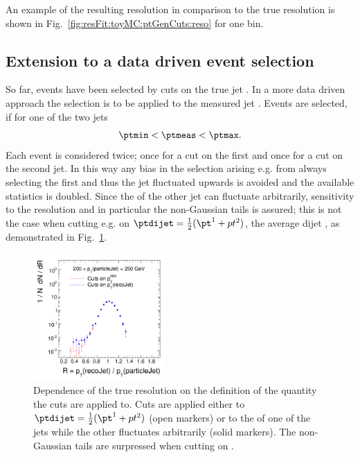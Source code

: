 \documentclass[a4paper]{cmspaper} %
\begin{document}
An example of the resulting resolution in comparison to the true
resolution is shown in Fig.~\ref{fig:resFit:toyMC:ptGenCuts:reso} for
one \pttrue bin.


\subsection{Extension to a data driven event selection}\label{sec:resFit:dataDrivenExt}
So far, events have been selected by cuts on the true jet \pt.
In a more data driven approach the selection is to be applied to the measured jet \pt.
Events are selected, if for one of the two jets
\begin{equation*}
  \ptmin < \ptmeas < \ptmax.
\end{equation*}
Each event is considered twice; once for a \pt cut on the first and once for a \pt cut on the second jet.
In this way any bias in the selection arising e.g. from always selecting the first and thus the jet fluctuated upwards is avoided and the available statistics is doubled.
Since the \pt of the other jet can fluctuate arbitrarily, sensitivity to the resolution and in particular the non-Gaussian tails is assured; this is not the case when cutting e.g. on \mbox{$\ptdijet = \frac{1}{2}(\pt^{1}+pt^{2})$}, the average dijet \pt, as demonstrated in Fig.~\ref{fig:resFit:ptBinning}.

\begin{figure}[ht]
  \centering
  \includegraphics[width=0.45\textwidth]{figures/resFit_QCD_PtBinningComp}
  \caption{Dependence of the true resolution on the definition of the quantity the cuts are applied to.
    Cuts are applied either to \mbox{$\ptdijet = \frac{1}{2}(\pt^{1}+pt^{2})$} (open markers) or to the \pt of one of the jets while the other fluctuates arbitrarily (solid markers).
    The non-Gaussian tails are surpressed when cutting on \ptdijet.}
  \label{fig:resFit:ptBinning}
\end{figure}
\end{document}
